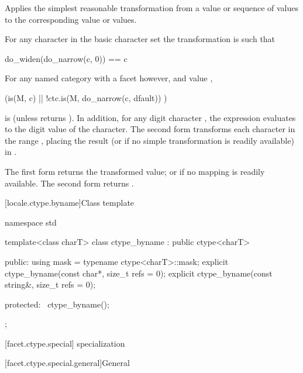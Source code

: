 \begin{itemdescr}
\pnum
\effects
Applies the simplest reasonable transformation
from a  value or sequence of  values
to the corresponding  value or values.

For any character  in the basic character set
the transformation is such that
\begin{codeblock}
do_widen(do_narrow(c, 0)) == c
\end{codeblock}

For any named  category with
a  facet  however, and
 value ,
\begin{codeblock}
(is(M, c) || !ctc.is(M, do_narrow(c, dfault)) )
\end{codeblock}
is  (unless  returns ).
In addition, for any digit character ,
the expression 
evaluates to the digit value of the character.
The second form transforms
each character  in the range ,
placing the result
(or  if no simple transformation is readily available)
in .

\pnum
\returns
The first form returns the transformed value;
or  if no mapping is readily available.
The second form returns .
\end{itemdescr}

[locale.ctype.byname]{Class template }

%
\begin{codeblock}
namespace std {
  template<class charT>
    class ctype_byname : public ctype<charT> {
    public:
      using mask = typename ctype<charT>::mask;
      explicit ctype_byname(const char*, size_t refs = 0);
      explicit ctype_byname(const string&, size_t refs = 0);

    protected:
      ~ctype_byname();
    };
}
\end{codeblock}

[facet.ctype.special]{ specialization}

[facet.ctype.special.general]{General}

